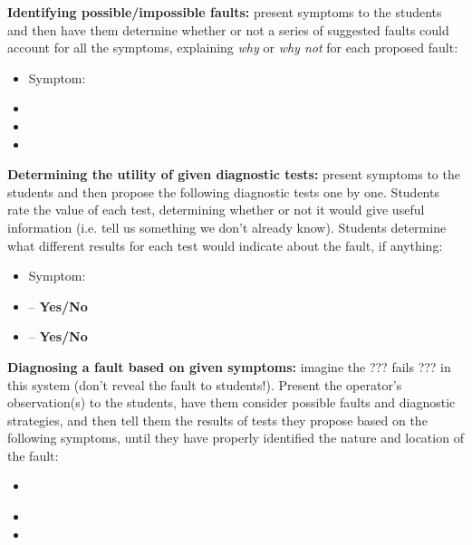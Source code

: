 \vskip 10pt


\noindent
{\bf Identifying possible/impossible faults:} present symptoms to the students and then have them determine whether or not a series of suggested faults could account for all the symptoms, explaining {\it why} or {\it why not} for each proposed fault:

\begin{itemize}
\item{} Symptom: {\it }
\item{} 
\item{} 
\item{} 
\end{itemize}


\vskip 10pt


\noindent
{\bf Determining the utility of given diagnostic tests:} present symptoms to the students and then propose the following diagnostic tests one by one.  Students rate the value of each test, determining whether or not it would give useful information (i.e. tell us something we don't already know).  Students determine what different results for each test would indicate about the fault, if anything:

\begin{itemize}
\item{} Symptom: {\it }
\item{}  -- {\bf Yes/No}
\item{}  -- {\bf Yes/No}
\end{itemize}


\vskip 10pt


\noindent
{\bf Diagnosing a fault based on given symptoms:} imagine the ??? fails ??? in this system (don't reveal the fault to students!).  Present the operator's observation(s) to the students, have them consider possible faults and diagnostic strategies, and then tell them the results of tests they propose based on the following symptoms, until they have properly identified the nature and location of the fault:

\begin{itemize}
\item{} {\it }
\item{} 
\item{} 
\end{itemize}




